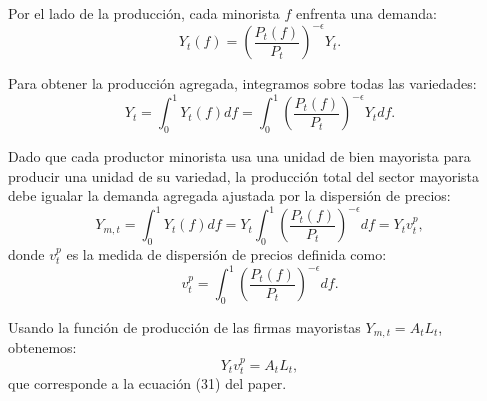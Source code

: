 \documentclass[../../entrega.tex]{subfiles}
\begin{document}
Por el lado de la producción, cada minorista $f$ enfrenta una demanda:
\begin{equation*}
    Y_t(f) = \left(\frac{P_t(f)}{P_t}\right)^{-\epsilon} Y_t.
\end{equation*}

Para obtener la producción agregada, integramos sobre todas las variedades:
\begin{equation*}
    Y_t = \int_0^1 Y_t(f)df = \int_0^1 \left(\frac{P_t(f)}{P_t}\right)^{-\epsilon} Y_t df.
\end{equation*}

Dado que cada productor minorista usa una unidad de bien mayorista para producir una unidad de su variedad, la producción total del sector mayorista debe igualar la demanda agregada ajustada por la dispersión de precios:
\begin{equation*}
    Y_{m,t} = \int_0^1 Y_t(f)df = Y_t \int_0^1 \left(\frac{P_t(f)}{P_t}\right)^{-\epsilon} df = Y_t v_t^p,
\end{equation*}
donde $v_t^p$ es la medida de dispersión de precios definida como:
\begin{equation*}
    v_t^p = \int_0^1 \left(\frac{P_t(f)}{P_t}\right)^{-\epsilon} df.
\end{equation*}

Usando la función de producción de las firmas mayoristas $Y_{m,t} = A_t L_t$, obtenemos:
\begin{equation}
    Y_t v_t^p = A_t L_t,
\end{equation}
que corresponde a la ecuación (31) del paper.
\end{document}
